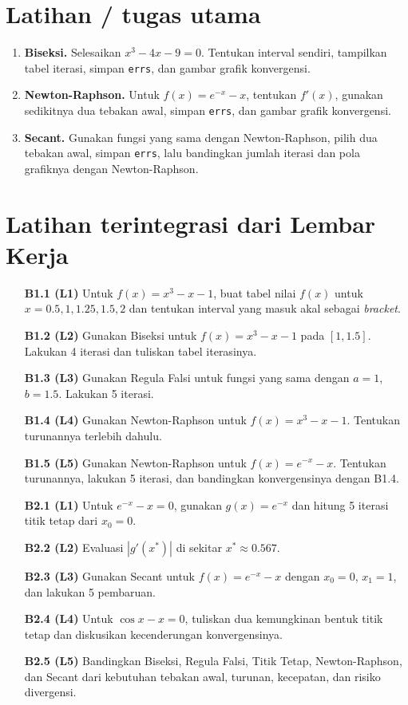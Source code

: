 
\section{Latihan / tugas utama}

\begin{enumerate}
\item \textbf{Biseksi.} Selesaikan $x^3-4x-9=0$. Tentukan interval sendiri, tampilkan tabel iterasi, simpan \texttt{errs}, dan gambar grafik konvergensi.
\item \textbf{Newton-Raphson.} Untuk $f(x)=e^{-x}-x$, tentukan $f'(x)$, gunakan sedikitnya dua tebakan awal, simpan \texttt{errs}, dan gambar grafik konvergensi.
\item \textbf{Secant.} Gunakan fungsi yang sama dengan Newton-Raphson, pilih dua tebakan awal, simpan \texttt{errs}, lalu bandingkan jumlah iterasi dan pola grafiknya dengan Newton-Raphson.
\end{enumerate}

\section{Latihan terintegrasi dari Lembar Kerja}

\begin{enumerate}
\item[\textbf{B1.1 (L1)}] Untuk \(f(x)=x^3-x-1\), buat tabel nilai \(f(x)\) untuk \(x=0.5,1,1.25,1.5,2\) dan tentukan interval yang masuk akal sebagai \textit{bracket}.
\item[\textbf{B1.2 (L2)}] Gunakan Biseksi untuk \(f(x)=x^3-x-1\) pada \([1,1.5]\). Lakukan 4 iterasi dan tuliskan tabel iterasinya.
\item[\textbf{B1.3 (L3)}] Gunakan Regula Falsi untuk fungsi yang sama dengan \(a=1\), \(b=1.5\). Lakukan 5 iterasi.
\item[\textbf{B1.4 (L4)}] Gunakan Newton-Raphson untuk \(f(x)=x^3-x-1\). Tentukan turunannya terlebih dahulu.
\item[\textbf{B1.5 (L5)}] Gunakan Newton-Raphson untuk \(f(x)=e^{-x}-x\). Tentukan turunannya, lakukan 5 iterasi, dan bandingkan konvergensinya dengan B1.4.
\item[\textbf{B2.1 (L1)}] Untuk \(e^{-x}-x=0\), gunakan \(g(x)=e^{-x}\) dan hitung 5 iterasi titik tetap dari \(x_0=0\).
\item[\textbf{B2.2 (L2)}] Evaluasi \(|g'(x^\ast)|\) di sekitar \(x^\ast\approx0.567\).
\item[\textbf{B2.3 (L3)}] Gunakan Secant untuk \(f(x)=e^{-x}-x\) dengan \(x_0=0\), \(x_1=1\), dan lakukan 5 pembaruan.
\item[\textbf{B2.4 (L4)}] Untuk \(\cos x-x=0\), tuliskan dua kemungkinan bentuk titik tetap dan diskusikan kecenderungan konvergensinya.
\item[\textbf{B2.5 (L5)}] Bandingkan Biseksi, Regula Falsi, Titik Tetap, Newton-Raphson, dan Secant dari kebutuhan tebakan awal, turunan, kecepatan, dan risiko divergensi.
\end{enumerate}

